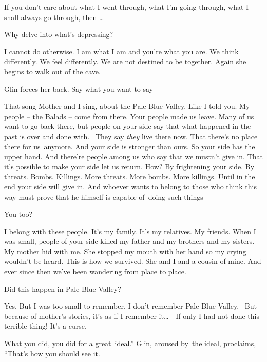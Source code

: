 \documentclass[letterpaper]{article}
\begin{document}
{\textquotedbl}If you don't care about what I went through, what I'm going through, what I shall always go through, then
{\dots}{\textquotedbl} 

{\textquotedbl}Why delve into what's depressing?{\textquotedbl} 

{\textquotedbl}I cannot do otherwise. I am what I am and you're what you are. We think differently. We feel differently.
We are not destined to be together.{\textquotedbl} Again she begins to walk out of the cave. 

Glin forces her back. {\textquotedbl}Say what you want to say -{\textquotedbl} 

{\textquotedbl}That song Mother and I sing, about the Pale Blue Valley. Like I told you. My people -- the Balads -- come
from there. Your people made us leave. Many of us want to go back there, but people on your side say that what happened
in the past is over and done with. ~They say \textit{they }live there now. That there's no place there for us~anymore.
And your side is stronger than ours. So your side has the upper hand. And there're people among us who say that we
mustn't give in. That it's possible to make your side let us return. How? By frightening your side. By threats. Bombs.
Killings. More threats. More bombs. More killings. Until in the end your side will give in. And whoever wants to belong
to those who think this way must prove that he himself is capable of~doing such things --{\textquotedbl} 

{\textquotedbl}You too?{\textquotedbl} 

{\textquotedbl}I belong with these people. It's my family. It's my relatives. My friends. When I was small, people of
your side killed my father and my brothers and my sisters. My mother hid with me. She stopped my mouth with her hand so
my crying wouldn't be heard. This is how we survived. She and I and a cousin of mine. And ever since then we've been
wandering from place to place.{\textquotedbl} 

{\textquotedbl}Did this happen in Pale Blue Valley?{\textquotedbl} 

{\textquotedbl}Yes. But I was too small to remember. I don't remember Pale Blue Valley. ~But because of mother's
stories, it's as if I remember it{\dots}\ \ If only I had not done this terrible thing! It's a curse.{\textquotedbl} 

{\textquotedbl}What you did, you did for a great~ideal.'' Glin, aroused by\textcolor{red}{\ }the ideal, proclaims,
``That's how you should see it.{\textquotedbl} 
\end{document}
